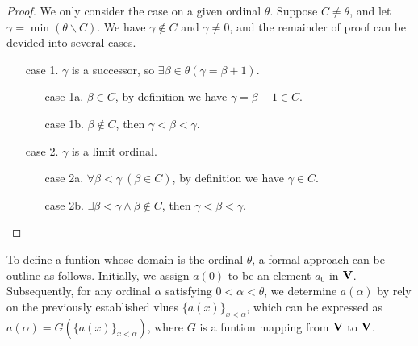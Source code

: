 \begin{proof}
  We only consider the case on a given ordinal $\theta$. Suppose $C \neq \theta$, and let $\gamma = \min(\theta \smallsetminus C)$. We have $\gamma \notin C$ and $\gamma \neq 0$, and the remainder of proof can be devided into several cases.
  \begin{enumerate}
    \item[case 1.] $\gamma$ is a successor, so $\exists \beta \in \theta (\gamma = \beta + 1)$.
    \begin{enumerate}
      \item[case 1a.] $\beta \in C$, by definition we have $\gamma = \beta + 1 \in C$.
      \item[case 1b.] $\beta \notin C$, then $\gamma < \beta < \gamma$. 
    \end{enumerate}
    \item[case 2.] $\gamma$ is a limit ordinal.
    \begin{enumerate}
      \item[case 2a.] $\forall \beta < \gamma\ (\beta \in C)$, by definition we have $\gamma \in C$.
      \item[case 2b.] $\exists \beta < \gamma \wedge \beta \notin C$, then $\gamma < \beta < \gamma$. 
    \end{enumerate}
  \end{enumerate}
\end{proof}






To define a funtion whose domain is the ordinal $\theta$, a formal approach can be outline as follows. Initially, we assign $a(0)$ to be an element $a_0$ in $\boldsymbol{\mathrm{V}}$. Subsequently, for any ordinal $\alpha$ satisfying $0< \alpha < \theta$, we determine $a(\alpha)$ by rely on the previously established vlues $\{ a(x) \}_{x < \alpha}$, which can be expressed as $a(\alpha) = G(\{ a(x) \}_{x < \alpha})$, where $G$ is a funtion mapping from $\boldsymbol{\mathrm{V}}$ to $\boldsymbol{\mathrm{V}}$.



